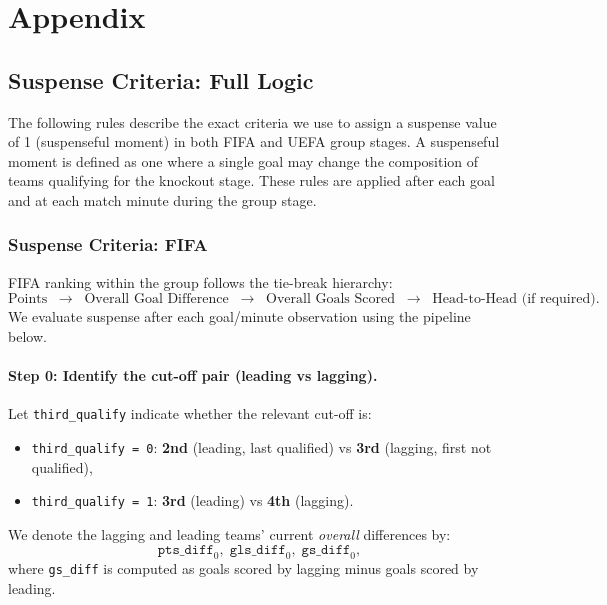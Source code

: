 \documentclass[11pt]{article}
\begin{document}




\appendix
\section*{Appendix}

\subsection{Suspense Criteria: Full Logic}
\label{sec:suspense-criteria}

The following rules describe the exact criteria we use to assign a suspense value of 1 (suspenseful moment) in both FIFA and UEFA group stages. A suspenseful moment is defined as one where a single goal may change the composition of teams qualifying for the knockout stage. These rules are applied after each goal and at each match minute during the group stage.

\subsubsection*{Suspense Criteria: FIFA}
\label{sec:suspense-fifa-implemented}

FIFA ranking within the group follows the tie-break hierarchy:
\[
\text{Points} \;\; \rightarrow \;\; \text{Overall Goal Difference} \;\; \rightarrow \;\; \text{Overall Goals Scored} \;\; \rightarrow \;\; \text{Head-to-Head (if required)}.
\]
We evaluate suspense after each goal/minute observation using the pipeline below.

\paragraph{Step 0: Identify the cut-off pair (leading vs lagging).}
Let \texttt{third\_qualify} indicate whether the relevant cut-off is:
\begin{itemize}
    \item \texttt{third\_qualify = 0}: \textbf{2nd} (leading, last qualified) vs \textbf{3rd} (lagging, first not qualified),
    \item \texttt{third\_qualify = 1}: \textbf{3rd} (leading) vs \textbf{4th} (lagging).
\end{itemize}
We denote the lagging and leading teams' current \emph{overall} differences by:
\[
\texttt{pts\_diff}_0,\;\texttt{gls\_diff}_0,\;\texttt{gs\_diff}_0,
\]
where \texttt{gs\_diff} is computed as goals scored by lagging minus goals scored by leading.
\end{document}
